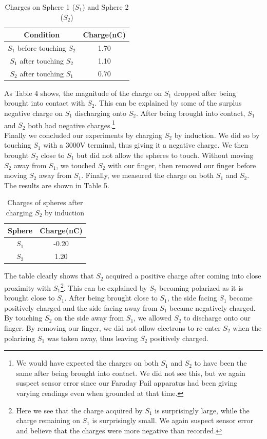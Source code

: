\documentclass[oneside,12pt]{amsart}
\begin{document}
\begin{table}[H]
	\begin{tabular}{ |c|c|}
		\hline
		 Condition& Charge(nC)\\
		\hline
		$S_1$ before touching $S_2$&1.70\\
		$S_1$ after touching $S_2$&1.10\\
		$S_2$ after touching $S_1$&0.70\\
		\hline	
	\end{tabular}
	\caption{Charges on Sphere 1 ($S_1$) and Sphere 2 ($S_2$)}
\end{table}

\indent As Table 4 shows, the magnitude of the charge on $S_1$ dropped after being brought into contact with $S_2$. This can be explained by some of the surplus negative charge on $S_1$ discharging onto $S_2$. After being brought into contact, $S_1$ and $S_2$ both had negative charges.\footnote{We would have expected the charges on both $S_1$ and $S_2$ to have been the same after being brought into contact. We did not see this, but we again suspect sensor error since our Faraday Pail apparatus had been giving varying readings even when grounded at that time.}\\

\indent Finally we concluded our experiments by charging $S_2$ by induction. We did so by touching $S_1$ with a 3000V terminal, thus giving it a negative charge. We then brought $S_2$ close to $S_1$ but did not allow the spheres to touch. Without moving $S_2$ away from $S_1$, we touched $S_2$ with our finger, then removed our finger before moving $S_2$ away from $S_1$. Finally, we measured the charge on both $S_1$ and $S_2$. The results are shown in Table 5.

\begin{table}[H]
	\begin{tabular}{ |c|c|}
		\hline
		Sphere & Charge(nC)\\
		\hline
		$S_1$&-0.20\\
		$S_2$&1.20\\
		\hline	
	\end{tabular}
	\caption{Charges of spheres after charging $S_2$ by induction}
\end{table}

\indent The table clearly shows that $S_2$ acquired a positive charge after coming into close proximity with $S_1$\footnote{Here we see that the charge acquired by $S_1$ is surprisingly large, while the charge remaining on $S_1$ is surprisingly small. We again suspect sensor error and believe that the charges were more negative than recorded.}. This can be explained by $S_2$ becoming polarized as it is brought close to $S_1$. After being brought close to $S_1$, the side facing $S_1$ became positively charged and the side facing away from $S_1$ became negatively charged. By touching $S_2$ on the side away from $S_1$, we allowed $S_2$ to discharge onto our finger. By removing our finger, we did not allow electrons to re-enter $S_2$ when the polarizing $S_1$ was taken away, thus leaving $S_2$ positively charged.
\end{document}
